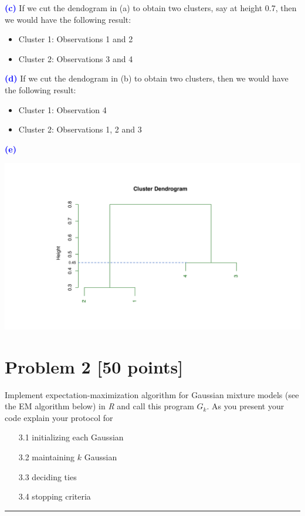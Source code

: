 \documentclass[a4paper,12pt]{article}
\newcommand{\qnum}[1]{\noindent\textcolor{blue}{\textbf{(#1)}}}
\newcommand{\sep}{\begin{center}\textcolor{gray}{\rule{\textwidth}{0.75pt}}\end{center}}
\begin{document}
\qnum{c}
If we cut the dendogram in (a) to obtain two clusters, say at height 0.7, then we would have the following result:
\begin{itemize}
    \item Cluster 1: Observations 1 and 2
    \item Cluster 2: Observations 3 and 4
\end{itemize}




\qnum{d}
If we cut the dendogram in (b) to obtain two clusters, then we would have the following result:
\begin{itemize}
    \item Cluster 1: Observation 4
    \item Cluster 2: Observations 1, 2 and 3
\end{itemize}


\qnum{e}
\begin{center}
  \includegraphics[width=0.75\linewidth]{Image/Prob1e.pdf}
\end{center}
\bigskip









\newpage 




\section*{Problem 2 [50 points]} 

 Implement expectation-maximization algorithm for Gaussian mixture models (see the EM algorithm below) in \textit{R}  and call this program $G_k$. As you present your code explain your protocol for


\begin{enumerate}
  \item[3.1] initializing each Gaussian
  \item[3.2] maintaining $k$ Gaussian
  \item[3.3]  deciding ties
  \item[3.4] stopping criteria
\end{enumerate}
\sep 
\end{document}
